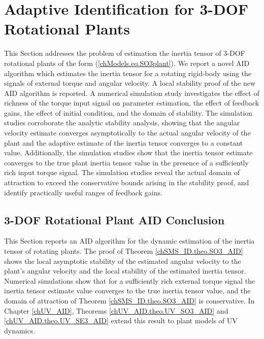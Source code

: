 \section{ Adaptive Identification for 3-\acs{DOF} Rotational Plants 
  }\label{chSMS_ID.sec.SO3_AID}

This Section addresses the problem of estimation the inertia tensor
of 3-\ac{DOF} rotational plants of the form
(\ref{chModels.eq.SO3plant}).
%
We report a novel \ac{AID} algorithm which estimates the inertia
tensor for a rotating rigid-body using the signals of external torque
and angular velocity.
%
A local stability proof of the new \ac{AID} algorithm is reported.
% 
A numerical simulation study investigates the effect of richness of
the torque input signal on parameter estimation, the effect of
feedback gains, the effect of initial condition, and the domain of
stability.
%
The simulation studies corroborate the analytic stability analysis,
showing that the angular velocity estimate converges asymptotically to
the actual angular velocity of the plant and the adaptive estimate of
the inertia tensor converges to a constant value.
%
Additionally, the simulation studies show that the inertia tensor
estimate converges to the true plant inertia tensor value in the
presence of a sufficiently rich input torque signal.
%
The simulation studies reveal the actual domain of attraction to
exceed the conservative bounds arising in the stability proof, and
identify practically useful ranges of feedback gains.





\subsection{ 3-\acs{DOF} Rotational Plant \acs{AID} Conclusion}

This Section reports an \ac{AID} algorithm for the dynamic estimation
of the inertia tensor of rotating plants.
%
The proof of Theorem \ref{chSMS_ID.theo.SO3_AID} shows the local
asymptotic stability of the estimated angular velocity to the plant's
angular velocity and the local stability of the estimated inertia
tensor. 
%
Numerical simulations show that for a sufficiently rich external
torque signal the inertia tensor estimate value converges to the true
inertia tensor value, and the domain of attraction of Theorem
\ref{chSMS_ID.theo.SO3_AID} is conservative.
%
In Chapter \ref{chUV_AID}, Theorems \ref{chUV_AID.theo.UV_SO3_AID} and
\ref{chUV_AID.theo.UV_SE3_AID} extend this result to plant models of
\ac{UV} dynamics.

